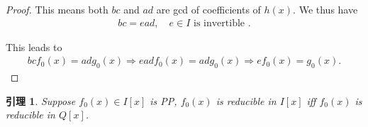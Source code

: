 \documentclass[utf8]{ctexbook}
\newtheorem{lemma}{引理}[section]
\begin{document}
\begin{proof}
This means both $bc$ and $ad$ are gcd of coefficients of $h(x)$. We thus have
\begin{align*}
bc = e ad, \quad e \in I \mbox{ is invertible }.
\end{align*}

This leads to
\begin{align*}
bc f_0 (x) = ad g_0 (x) \Longrightarrow ea d f_0 (x) = ad g_0 (x) \Longrightarrow e f_0 (x) = g_0 (x) .
\end{align*}

\end{proof}


\begin{lemma}
\label{lemma_Factor_poly_ring_3}
Suppose $f_0 (x) \in I[x]$ is PP, $f_0(x)$ is reducible in $I[x]$ iff $f_0 (x)$ is reducible in $Q[x]$.
\end{lemma}
\end{document}
